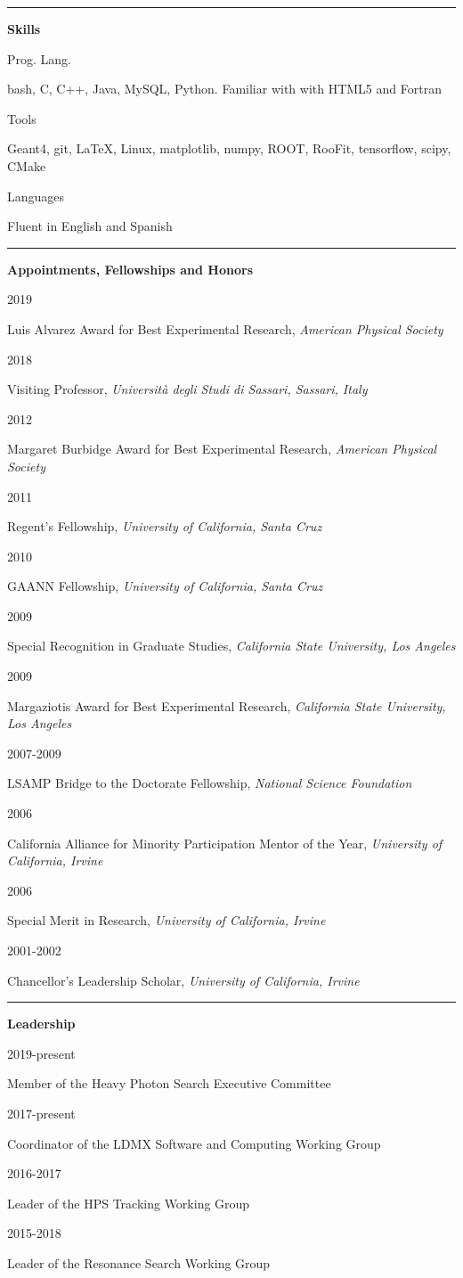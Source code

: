 \documentclass[11pt]{article}
\newcommand{\cvsection}[1] {
    \noindent
    \textcolor{indigodye}{\rule{.15\textwidth}{.1in} \hspace{0.01 \textwidth} \textbf{\Large{#1}}} \newline 
}
\newcommand{\skillsentry}[2] { 
    \noindent
    \begin{minipage}[t]{0.15\textwidth} \begin{flushright} #1 \end{flushright} \end{minipage} \hspace{0.01\textwidth}
    \begin{minipage}[t]{0.84\textwidth} #2 \end{minipage}
}
\newcommand{\awardentry}[3] { 
    \noindent
    \begin{minipage}[t]{0.15\textwidth} \begin{flushright} #1 \end{flushright} \end{minipage} \hspace{0.01\textwidth}
    \begin{minipage}[t]{0.84\textwidth} #2,  \emph{#3} 
    \end{minipage}
}
\newcommand{\leadentry}[2] { 
    \noindent
    \begin{minipage}[t]{0.15\textwidth} \begin{flushright} #1 \end{flushright} \end{minipage} \hspace{0.01\textwidth}
    \begin{minipage}[t]{0.84\textwidth} #2
    \end{minipage}
}
\newcommand{\teachingentry}[4] { 
    \noindent
    \begin{minipage}[t]{0.15\textwidth} \begin{flushright} #1 \end{flushright} \end{minipage} \hspace{0.01\textwidth}
    \begin{minipage}[t]{0.84\textwidth}
        \textbf{#2} \newline
        #3  
    \end{minipage} \\[0.01pt]
    #4 \vspace{11pt}
}
\begin{document}
    \cvsection{Skills}
        \skillsentry{Prog. Lang.}{bash, C, C++, Java, MySQL, Python. Familiar with with HTML5 and Fortran}
        \skillsentry{Tools}{Geant4, git, \LaTeX, Linux, matplotlib, numpy, ROOT, RooFit, tensorflow, scipy, CMake}
        \skillsentry{Languages}{Fluent in English and Spanish}

    \cvsection{Appointments, Fellowships and Honors}
        \awardentry{2019}{Luis Alvarez Award for Best Experimental Research}{American Physical Society}
        \awardentry{2018}{Visiting Professor}{Università degli Studi di Sassari, Sassari, Italy}
        \awardentry{2012}{Margaret Burbidge Award for Best Experimental Research}{American Physical Society} 
        \awardentry{2011}{Regent's Fellowship}{University of California, Santa Cruz}
        \awardentry{2010}{GAANN Fellowship}{University of California, Santa Cruz}
        \awardentry{2009}{Special Recognition in Graduate Studies}
                         {California State University, Los Angeles}
        \awardentry{2009}{Margaziotis Award for Best Experimental Research}
                         {California State University, Los Angeles}
        \awardentry{2007-2009}{LSAMP Bridge to the Doctorate Fellowship}
                              {National Science Foundation} 
        \awardentry{2006}{California Alliance for Minority Participation Mentor of the Year}
                         {University of California, Irvine}
        \awardentry{2006}{Special Merit in Research}
                         {University of California, Irvine}
        \awardentry{2001-2002}{Chancellor's Leadership Scholar}
                         {University of California, Irvine}

    \cvsection{Leadership}
        \leadentry{2019-present}{Member of the Heavy Photon Search Executive Committee}
        \leadentry{2017-present}{Coordinator of the LDMX Software and Computing Working Group}
        \leadentry{2016-2017}{Leader of the HPS Tracking Working Group}
        \leadentry{2015-2018}{Leader of the Resonance Search Working Group}

\end{document}
